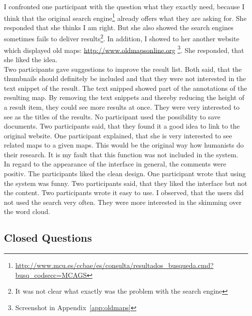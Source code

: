 \documentclass[11pt]{report}
\begin{document}
I confronted one participant with the question what they exactly need, because I think that the original search engine\footnote{\url{http://www.mcu.es/ccbae/es/consulta/resultados_busqueda.cmd?busq_codsecc=MCAGS}} already offers what they are asking for. She responded that she thinks I am right. But she also showed the search engines sometimes fails to deliver results\footnote{It was not clear what exactly was the problem with the search engine}. In addition, I showed to her another website which displayed old maps: \url{http://www.oldmapsonline.org} \footnote{Screenshot in Appendix~\ref{app:oldmaps}}. She responded, that she liked the idea. \\

Two participants gave suggestions to improve the result list. Both said, that the thumbnails should definitely be included and that they were not interested in the text snippet of the result. The text snipped showed part of the annotations of the resulting map. By removing the text snippets and thereby reducing the height of a result item, they could see more results at once. They were very interested to see as the titles of the results. No participant used the possibility to save documents. Two participants said, that they found it a good idea to link to the original website. One participant explained, that she is very interested to see related maps to a given maps. This would be the original way how humanists do their research. It is my fault that this function was not included in the system. \\

In regard to the appearance of the interface in general, the comments were positiv. The participants liked the clean design. One participant wrote that using the system was funny. Two participants said, that they liked the interface but not the content. Two participants wrote it easy to use. I observed, that the users did not used the search very often. They were more interested in the skimming over the word cloud.

\subsection{Closed Questions}
\end{document}
